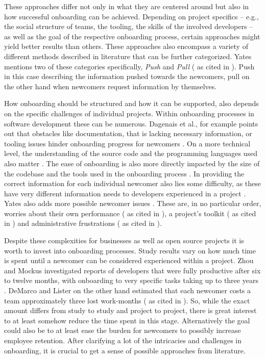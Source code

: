 These approaches differ not only in what they are centered around but also in how successful onboarding can be achieved. Depending on project specifics -- e.g., the social structure of teams, the tooling, the skills of the involved developers -- as well as the goal of the respective onboarding process, certain approaches might yield better results than others. These approaches also encompass a variety of different methods described in literature that can be further categorized. Yates mentions two of these categories specifically, \textit{Push} and \textit{Pull} (\cite{cybenko1999foundations} as cited in \cite[p. 29]{yates2014onboarding}). Push in this case describing the information pushed towards the newcomers, pull on the other hand when newcomers request information by themselves.

How onboarding should be structured and how it can be supported, also depends on the specific challenges of individual projects. Within onboarding processes in software development these can be numerous. Dagenais et al., for example points out that obstacles like documentation, that is lacking necessary information, or tooling issues hinder onboarding progress for newcomers \cite{dagenais2010moving}. On a more technical level, the understanding of the source code and the programming languages used also matter \cite{berlin1992consultants}. The ease of onboarding is also more directly impacted by the size of the codebase and the tools used in the onboarding process \cite{neville2008code}. In providing the correct information for each individual newcomer also lies some difficulty, as these have very different information needs to developers experienced in a project \cite{cherubini2007let}. Yates also adds more possible newcomer issues \cite[p. 35]{yates2014onboarding}. These are, in no particular order, worries about their own performance (\cite{berlin1992consultants} as cited in \cite{yates2014onboarding}), a project's toolkit (\cite{berlin1993beyond} as cited in \cite{yates2014onboarding}) and administrative frustrations (\cite{sim1998ramp} as cited in \cite{yates2014onboarding}).

Despite these complexities for businesses as well as open source projects it is worth to invest into onboarding processes. Study results vary on how much time is spent until a newcomer can be considered experienced within a project. Zhou and Mockus investigated reports of developers that were fully productive after six to twelve months, with onboarding to very specific tasks taking up to three years \cite{zhou2010developer}. DeMarco and Lister on the other hand estimated that each newcomer costs a team approximately three lost work-months (\cite{demarco2013peopleware} as cited in \cite{yates2014onboarding}). So, while the exact amount differs from study to study and project to project, there is great interest to at least somehow reduce the time spent in this stage. Alternatively the goal could also be to at least ease the burden for newcomers to possibly increase employee retention. After clarifying a lot of the intricacies and challenges in onboarding, it is crucial to get a sense of possible approaches from literature.

